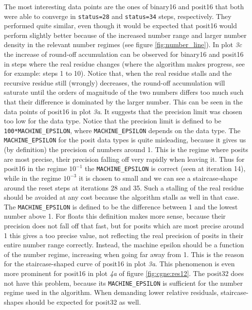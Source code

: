 \documentclass{article}
\theoremstyle{plain} %
\theoremstyle{convention} %
\theoremstyle{remark} %
\def\code#1{\texttt{#1}}
\numberwithin{equation}{section}
\begin{document}
The most interesting data points are the ones of \gls{binary16} and \gls{posit16} that both were able to converge in \code{status=28} and \code{status=34} steps, respectively. They performed quite similar, even though it would be expected that \gls{posit16} would perform slightly better because of the increased number range and larger number density in the relevant number regimes (see figure \ref{fig:number_line}). In plot \textit{3c} the increase of round-off accumulation can be observed for \gls{binary16} and \gls{posit16} in steps where the real residue changes (where the algorithm makes progress, see for example: steps \num{1} to \num{10}). Notice that, when the real residue stalls and the recursive residue still (wrongly) decreases, the round-off accumulation will saturate until the orders of magnitude of the two numbers differs too much such that their difference is dominated by the larger number. This can be seen in the data points of \gls{posit16} in plot \textit{3a}. It suggests that the precision limit was chosen too low for the data type. Notice that the precision limit is defined to be \code{100*MACHINE\_EPSILON}, where \code{MACHINE\_EPSILON} depends on the data type. The \code{MACHINE\_EPSILON} for the posit data types is quite misleading, because it gives us (by definition) the precision of numbers around \num{1}. This is the regime where posits are most precise, their precision falling off very rapidly when leaving it. Thus for \gls{posit16} in the regime $10^{-1}$ the \code{MACHINE\_EPSILON} is correct (seen at iteration \num{14}), while in the regime $10^{-3}$ it is chosen to small and we can see a staircase-shape around the reset steps at iterations \num{28} and \num{35}. Such a stalling of the real residue should be avoided at any cost because the algorithm stalls as well in that case. The \code{MACHINE\_EPSILON} is defined to be the difference between \num{1} and the lowest number above \num{1}. For floats this definition makes more sense, because their precision does not fall off that fast, but for posits which are most precise around \num{1} this gives a too precise value, not reflecting the real precision of posits in their entire number range correctly. Instead, the machine epsilon should be a function of the number regime, increasing when going far away from \num{1}. This is the reason for the staircase-shaped curve of \gls{posit16} in plot \textit{3a}. This phenomenon is even more prominent for \gls{posit16} in plot \textit{4a} of figure \ref{fig:cgne:res12}. The \gls{posit32} does not have this problem, because its \code{MACHINE\_EPSILON} is sufficient for the number regime used in the algorithm. When demanding lower relative residuals, staircase-shapes should be expected for \gls{posit32} as well.
\end{document}
